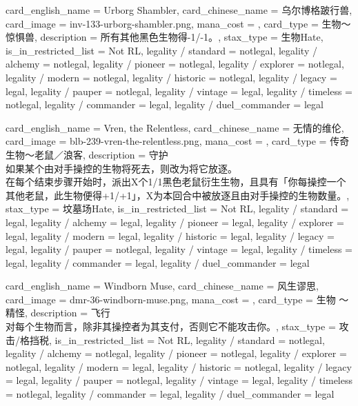 \documentclass[lang = cn, color = black, 10pt]{AllThatStax}
\begin{document}
\card
{
	card_english_name = {Urborg Shambler},
	card_chinese_name = {乌尔博格跛行兽},
	card_image = inv-133-urborg-shambler.png,
	mana_cost = ,
	card_type = 生物～惊惧兽,
	description = {所有其他黑色生物得-1/-1。},
	stax_type = 生物Hate,
	is_in_restricted_list = Not RL,
	legality / standard = notlegal,
	legality / alchemy = notlegal,
	legality / pioneer = notlegal,
	legality / explorer = notlegal,
	legality / modern = notlegal,
	legality / historic = notlegal,
	legality / legacy = legal,
	legality / pauper = notlegal,
	legality / vintage = legal,
	legality / timeless = notlegal,
	legality / commander = legal,
	legality / duel_commander = legal
}

\card
{
	card_english_name = {Vren, the Relentless},
	card_chinese_name = {无情的维伦},
	card_image = blb-239-vren-the-relentless.png,
	mana_cost = ,
	card_type = 传奇生物～老鼠／浪客,
	description = {守护\\
如果某个由对手操控的生物将死去，则改为将它放逐。\\
在每个结束步骤开始时，派出X个1/1黑色老鼠衍生生物，且具有「你每操控一个其他老鼠，此生物便得+1/+1」，X为本回合中被放逐且由对手操控的生物数量。},
	stax_type = 坟墓场Hate,
	is_in_restricted_list = Not RL,
	legality / standard = legal,
	legality / alchemy = legal,
	legality / pioneer = legal,
	legality / explorer = legal,
	legality / modern = legal,
	legality / historic = legal,
	legality / legacy = legal,
	legality / pauper = notlegal,
	legality / vintage = legal,
	legality / timeless = legal,
	legality / commander = legal,
	legality / duel_commander = legal
}

\card
{
	card_english_name = {Windborn Muse},
	card_chinese_name = {风生谬思},
	card_image = dmr-36-windborn-muse.png,
	mana_cost = ,
	card_type = 生物 ～精怪,
	description = {飞行\\
对每个生物而言，除非其操控者为其支付，否则它不能攻击你。},
	stax_type = 攻击/格挡税,
	is_in_restricted_list = Not RL,
	legality / standard = notlegal,
	legality / alchemy = notlegal,
	legality / pioneer = notlegal,
	legality / explorer = notlegal,
	legality / modern = legal,
	legality / historic = notlegal,
	legality / legacy = legal,
	legality / pauper = notlegal,
	legality / vintage = legal,
	legality / timeless = notlegal,
	legality / commander = legal,
	legality / duel_commander = legal
}
\end{document}
